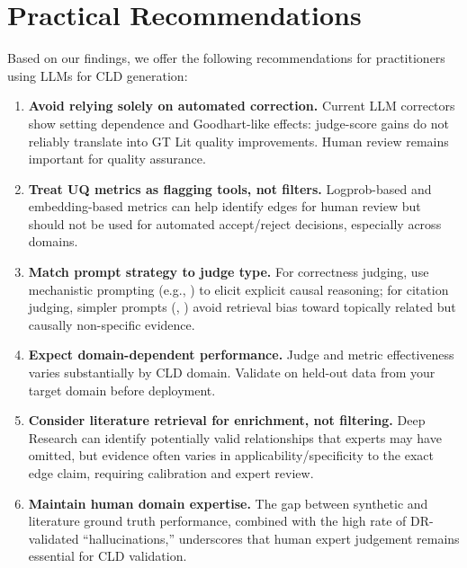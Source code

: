 \section{Practical Recommendations}
\label{sec:discussion_recommendations}

Based on our findings, we offer the following recommendations for practitioners using LLMs for CLD generation:

\begin{enumerate}
    \item \textbf{Avoid relying solely on automated correction.} Current LLM correctors show setting dependence and Goodhart-like effects: judge-score gains do not reliably translate into GT Lit quality improvements. Human review remains important for quality assurance.
    
    \item \textbf{Treat UQ metrics as flagging tools, not filters.} Logprob-based and embedding-based metrics can help identify edges for human review but should not be used for automated accept/reject decisions, especially across domains.
    
    \item \textbf{Match prompt strategy to judge type.} For correctness judging, use mechanistic prompting (e.g., \PromptMechanistic{}) to elicit explicit causal reasoning; for citation judging, simpler prompts (\PromptBaseline{}, \PromptCoT{}) avoid retrieval bias toward topically related but causally non-specific evidence.
    
    \item \textbf{Expect domain-dependent performance.} Judge and metric effectiveness varies substantially by CLD domain. Validate on held-out data from your target domain before deployment.
    
    \item \textbf{Consider literature retrieval for enrichment, not filtering.} Deep Research can identify potentially valid relationships that experts may have omitted, but evidence often varies in applicability/specificity to the exact edge claim, requiring calibration and expert review.
    
    \item \textbf{Maintain human domain expertise.} The gap between synthetic and literature ground truth performance, combined with the high rate of DR-validated ``hallucinations,'' underscores that human expert judgement remains essential for CLD validation.
\end{enumerate}


